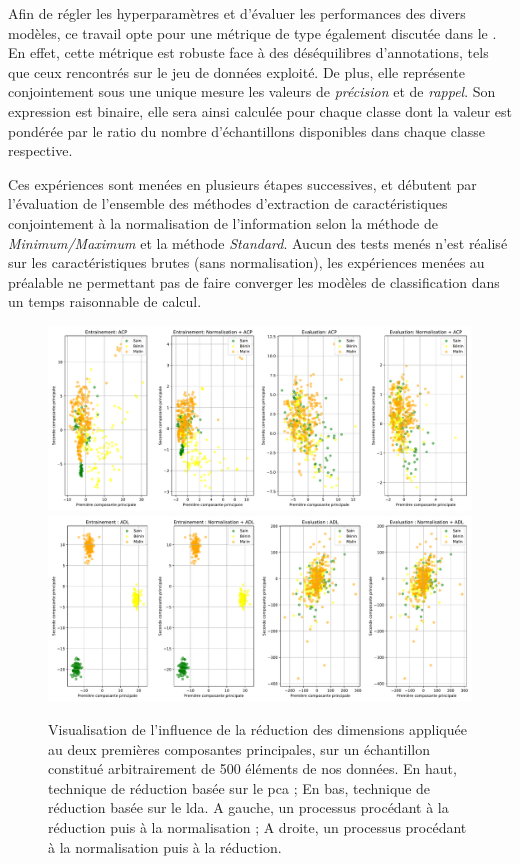 Afin de régler les hyperparamètres et d'évaluer les performances des divers modèles, ce travail opte pour une métrique de type \fscore{} également discutée dans le . En effet, cette métrique est robuste face à des déséquilibres d'annotations, tels que ceux rencontrés sur le jeu de données exploité. De plus, elle représente conjointement sous une unique mesure les valeurs de \textit{précision} et de \textit{rappel}. Son expression est binaire, elle sera ainsi calculée pour chaque classe dont la valeur est pondérée par le ratio du nombre d'échantillons disponibles dans chaque classe respective.\par

Ces expériences sont menées en plusieurs étapes successives, et débutent par l'évaluation de l'ensemble des méthodes d'extraction de caractéristiques conjointement à la normalisation de l'information selon la méthode de \textit{Minimum/Maximum} et la méthode \textit{Standard}. Aucun des tests menés n'est réalisé sur les caractéristiques brutes (sans normalisation), les expériences menées au préalable ne permettant pas de faire converger les modèles de classification dans un temps raisonnable de calcul.\par
 
\begin{figure}[H]
    \centering
    \includegraphics[width=\linewidth]{contents/chapter_4/resources/visualisation_scaling_PCA.pdf}
    \includegraphics[width=\linewidth]{contents/chapter_4/resources/visualisation_scaling_LDA.pdf}
    \caption{Visualisation de l'influence de la réduction des dimensions appliquée au deux premières composantes principales, sur un échantillon constitué arbitrairement de 500 éléments de nos données. En haut, technique de réduction basée sur le \gls{pca} ; En bas, technique de réduction basée sur le \gls{lda}. A gauche, un processus procédant à la réduction puis à la normalisation ; A droite, un processus procédant à la normalisation puis à la réduction.}
    \label{fig:visualisation_scaling_reduction}
\end{figure}\par

